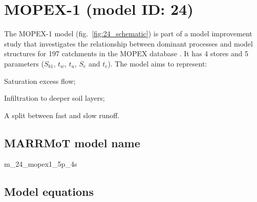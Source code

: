 \section{MOPEX-1 (model ID: 24)}
The MOPEX-1 model (fig.~\ref{fig:24_schematic}) is part of a model improvement study that investigates the relationship between dominant processes and model structures for 197 catchments in the MOPEX database \citep{Ye2012}. It has 4 stores and 5 parameters ($S_{b1}$, $t_w$, $t_u$, $S_e$ and $t_c$). The model aims to represent:

\begin{itemizecompact}
\item Saturation excess flow;
\item Infiltration to deeper soil layers;
\item A split between fast and slow runoff.
\end{itemizecompact}

\subsection{MARRMoT model name}
m\_24\_mopex1\_5p\_4s \\

\subsection{Model equations}

